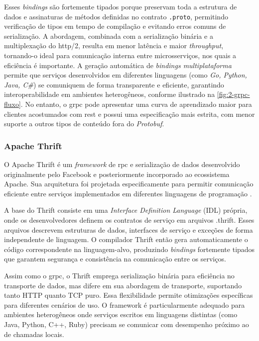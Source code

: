 Esses \textit{bindings} são fortemente tipados porque preservam toda a estrutura de dados e assinaturas de métodos definidas no contrato \texttt{.proto}, permitindo verificação de tipos em tempo de compilação e evitando erros comuns de serialização. A abordagem, combinada com a serialização binária e a multiplexação do \acrshort{http}/2, resulta em menor latência e maior \textit{throughput}, tornando-o ideal para comunicação interna entre microsserviços, nos quais a eficiência é importante. A geração automática de \textit{bindings multiplataforma} permite que serviços desenvolvidos em diferentes linguagens (como \textit{Go, Python, Java, C\#}) se comuniquem de forma transparente e eficiente, garantindo interoperabilidade em ambientes heterogêneos, conforme ilustrado na \autoref{fig:2-grpc-fluxo}. No entanto, o \acrshort{grpc} pode apresentar uma curva de aprendizado maior para clientes acostumados com \acrshort{rest} e possui uma especificação mais estrita, com menor suporte a outros tipos de conteúdo fora do \textit{Protobuf}.

\subsubsection{Apache Thrift}

O Apache Thrift é um \textit{framework} de \gls{rpc} e serialização de dados desenvolvido originalmente pelo Facebook e posteriormente incorporado ao ecossistema Apache. Sua arquitetura foi projetada especificamente para permitir comunicação eficiente entre serviços implementados em diferentes linguagens de programação \cite{apache_apache_nodate}.

A base do Thrift consiste em uma \textit{Interface Definition Language} (IDL) própria, onde os desenvolvedores definem os contratos de serviço em arquivos .thrift. Esses arquivos descrevem estruturas de dados, interfaces de serviço e exceções de forma independente de linguagem. O compilador Thrift então gera automaticamente o código correspondente na linguagem-alvo, produzindo \textit{bindings} fortemente tipados que garantem segurança e consistência na comunicação entre os serviços.

Assim como o \gls{grpc}, o Thrift emprega serialização binária para eficiência no transporte de dados, mas difere em sua abordagem de transporte, suportando tanto HTTP quanto TCP puro. Essa flexibilidade permite otimizações específicas para diferentes cenários de uso. O framework é particularmente adequado para ambientes heterogêneos onde serviços escritos em linguagens distintas (como Java, Python, C++, Ruby) precisam se comunicar com desempenho próximo ao de chamadas locais.

